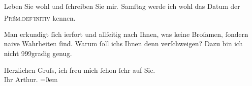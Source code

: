 \pstart
           {\pb}Leben Sie wohl und{ }ſchreiben Sie mir.
                  Samſtag werde ich wohl das Datum der \textsc{Prém.}\textsc{def}\substVorne{}\textsuperscript{.}\substDazwischen{}\textsc{initiv}\substHinten{} kennen.\pend
           
\pstart
           Man erkundigt{ }ſich i{\geminationm}erfort und allſeitig nach Ihnen,
               was keine Broſamen,{ }ſondern naive Wahrheiten {\pb}ſind.
               Warum{ }ſoll ichs Ihnen denn verſchweigen? Dazu bin ich nicht 999gradig genug.\pend
           
\pstart
           Herzlichen Gruſs, ich freu mich{ }ſchon{ }ſehr auf Sie.{\\[\baselineskip]}Ihr
                  \spacefill\mbox{Arthur.}\pend
           \leftskip=0em{}\endnumbering{}  \newcommand{\dateiname}{L00494}\newcommand{\titel}{Arthur Schnitzler an Richard Beer-Hofmann, 26. 9. 1895}\newcommand{\editorInnen}{Martin Anton Müller und Gerd-Hermann Susen}
